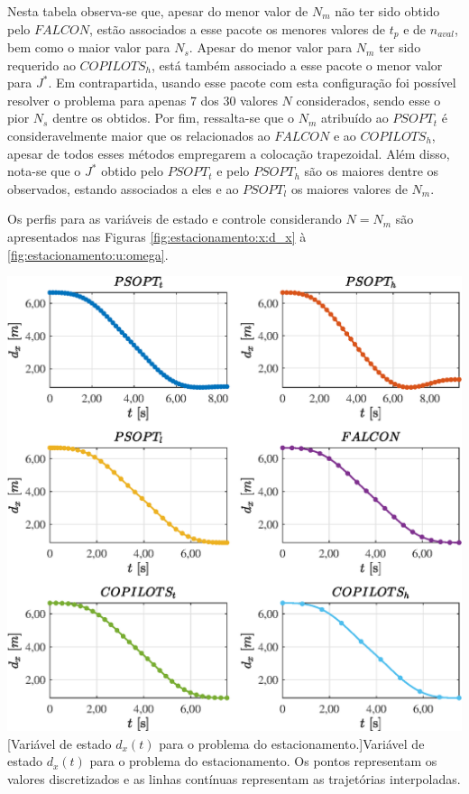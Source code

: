 Nesta tabela observa-se que, apesar do menor valor de $N_m$ não ter sido obtido pelo $FALCON$, estão associados a esse pacote os menores valores de $t_p$ e de $n_{aval}$, bem como o maior valor para $N_s$. 
Apesar do menor valor para $N_m$ ter sido requerido ao $COPILOTS_h$, está também associado a esse pacote o menor valor para $J^*$. Em contrapartida, usando esse pacote com esta configuração foi possível resolver o problema para apenas 7 dos 30 valores $N$ considerados, sendo esse o pior $N_s$ dentre os obtidos. Por fim, ressalta-se que o $N_m$ atribuído ao $PSOPT_t$ é consideravelmente maior que os relacionados ao $FALCON$ e ao $COPILOTS_h$, apesar de todos esses métodos empregarem a colocação trapezoidal. Além disso, nota-se que o $J^*$ obtido pelo $PSOPT_t$ e pelo $PSOPT_h$ são os maiores dentre os observados, estando associados a eles e ao $PSOPT_l$ os maiores valores de $N_m$. 


Os perfis para as variáveis de estado e controle considerando $ N = N_m $ são apresentados nas Figuras \ref{fig:estacionamento:x:d_x} à  \ref{fig:estacionamento:u:omega}. 

\noindent
\begin{minipage}{\textwidth}
	\vspace{\onelineskip}
	\centering
	\includegraphics[scale=0.7]{fig/resultados/estacionamento/traj/x/d_x}
	[Variável de estado $d_x(t)$ para o problema do estacionamento.]{Variável de estado $d_x(t)$ para o problema do estacionamento. Os pontos representam os valores discretizados e as linhas contínuas representam as trajetórias interpoladas.}
	\label{fig:estacionamento:x:d_x}
	\vspace{\onelineskip}
\end{minipage}

